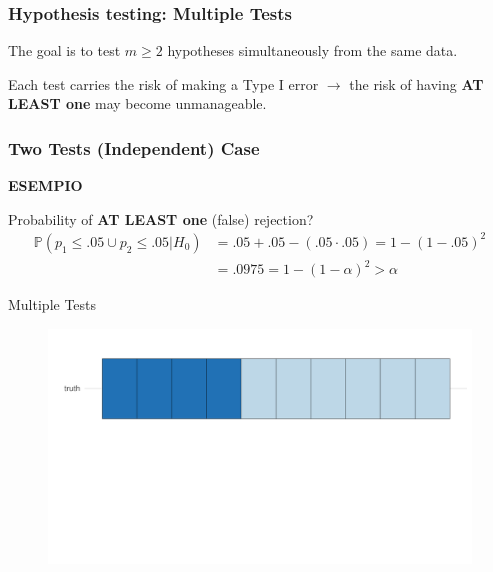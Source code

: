 \documentclass[xcolor={dvipsnames}]{beamer}
\newcommand{\rbf}[1]{\textcolor{redUnipd}{ #1}}
\begin{document}
\begin{frame}
\frametitle{Hypothesis testing: Multiple Tests}

The goal is to test $m \ge 2$ hypotheses simultaneously from the same data.

\bigskip

Each test carries the risk of making a \rbf{Type I error} $\rightarrow$ the risk of having \textbf{ AT LEAST one} may become unmanageable.    
\end{frame}


\begin{frame}
\frametitle{Two Tests (Independent) Case}

\textbf{\rbf{ESEMPIO}}

\bigskip

Probability of \textbf{ AT LEAST one} (false) rejection?\
\bigskip
\begin{align*}
\mathbb{P}(p_1\leq .05 \cup p_2\leq .05 | H_0) &= 
.05+.05-(.05\cdot .05)=1-(1-.05)^2 \\
&=.0975=1-(1-\alpha)^2 > \alpha
\end{align*}


\end{frame}

\begin{frame}{Multiple Tests}
    \begin{figure}
        \centering
        \includegraphics[width = \textwidth]{Slides/MTP/plaatjes/mt1.pdf}

    \end{figure}
\end{frame}
\end{document}
